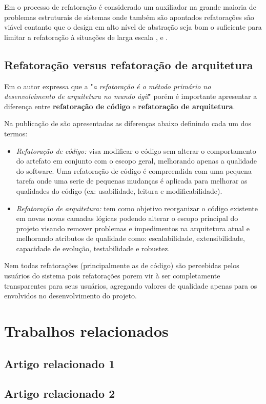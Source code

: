 Em \cite{babar2013agile} o processo de refatoração é considerado um auxiliador na grande maioria de problemas estruturais de sistemas onde também são apontados refatorações são viável contanto que o design em alto nível de abstração seja bom o suficiente para limitar a refatoração à situações de larga escala \cite{ihme2005agile}, \cite{kruchten2008situated} e \cite{boehm2002get}.

\subsection{Refatoração versus refatoração de arquitetura}
\label{ssec:codvsarq}

Em \cite{thapparambil2005agile} o autor expressa que a "\textit{a refatoração é o método primário no desenvolvimento de arquitetura no mundo ágil}" porém é importante apresentar a diferença entre \textbf{refatoração de código} e \textbf{refatoração de arquitetura}.

Na publicação de \cite{codevsarefactor} são apresentadas as diferenças abaixo definindo cada um dos termos:

\begin{itemize}
    \item \textit{Refatoração de código:} visa modificar o código sem alterar o comportamento do artefato em conjunto com o escopo geral, melhorando apenas a qualidade do software. Uma refatoração de código é compreendida com uma pequena tarefa onde uma serie de pequenas mudanças é aplicada para melhorar as qualidades do código (ex: usabilidade, leitura e modificabilidade).
    \item \textit{Refatoração de arquitetura:} tem como objetivo reorganizar o código existente em novas novas camadas lógicas podendo alterar o escopo principal do projeto visando remover problemas e impedimentos na arquitetura atual e melhorando atributos de qualidade como: escalabilidade, extensibilidade, capacidade de evolução, testabilidade e robustez. 
\end{itemize}

Nem todas refatorações (principalmente as de código) são percebidas pelos usuários do sistema pois refatorações porem vir à ser completamente transparentes para seus usuários, agregando valores de qualidade apenas para os envolvidos no desenvolvimento do projeto.


\section{Trabalhos relacionados}

\subsection{Artigo relacionado 1}

\subsection{Artigo relacionado 2}